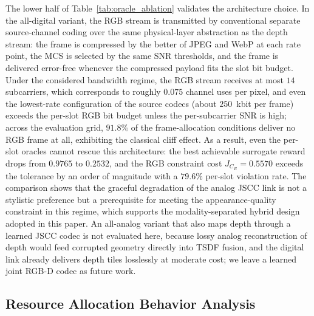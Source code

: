\documentclass[journal]{IEEEtran}
\begin{document}
The lower half of Table~\ref{tab:oracle_ablation} validates the architecture choice. In the all-digital variant, the RGB stream is transmitted by conventional separate source-channel coding over the same physical-layer abstraction as the depth stream: the frame is compressed by the better of JPEG and WebP at each rate point, the MCS is selected by the same SNR thresholds, and the frame is delivered error-free whenever the compressed payload fits the slot bit budget. Under the considered bandwidth regime, the RGB stream receives at most $14$ subcarriers, which corresponds to roughly $0.075$ channel uses per pixel, and even the lowest-rate configuration of the source codecs (about $250$~kbit per frame) exceeds the per-slot RGB bit budget unless the per-subcarrier SNR is high; across the evaluation grid, $91.8\%$ of the frame-allocation conditions deliver no RGB frame at all, exhibiting the classical cliff effect. As a result, even the per-slot oracles cannot rescue this architecture: the best achievable surrogate reward drops from $0.9765$ to $0.2532$, and the RGB constraint cost $J_{C_R}=0.5570$ exceeds the tolerance by an order of magnitude with a $79.6\%$ per-slot violation rate. The comparison shows that the graceful degradation of the analog JSCC link is not a stylistic preference but a prerequisite for meeting the appearance-quality constraint in this regime, which supports the modality-separated hybrid design adopted in this paper. An all-analog variant that also maps depth through a learned JSCC codec is not evaluated here, because lossy analog reconstruction of depth would feed corrupted geometry directly into TSDF fusion, and the digital link already delivers depth tiles losslessly at moderate cost; we leave a learned joint RGB-D codec as future work.

\subsection{Resource Allocation Behavior Analysis}
\end{document}
